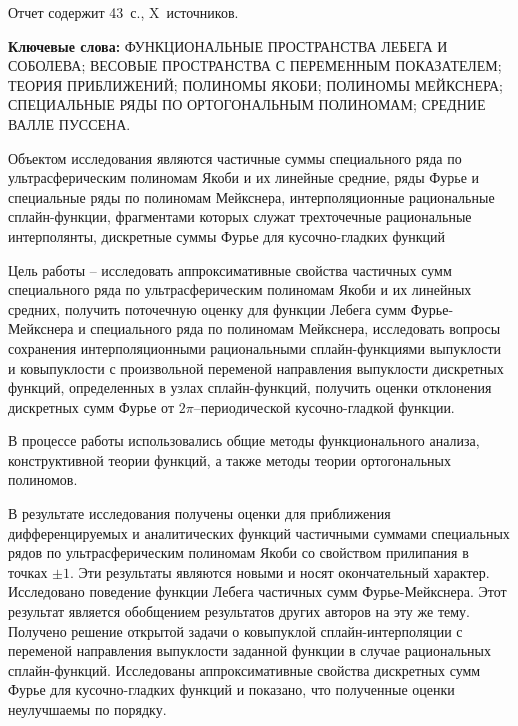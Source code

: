 \Referat %
Отчет содержит 43~с., X~источников.

\textbf{ Ключевые слова:}
ФУНКЦИОНАЛЬНЫЕ ПРОСТРАНСТВА ЛЕБЕГА И СОБОЛЕВА;
ВЕСОВЫЕ ПРОСТРАНСТВА С ПЕРЕМЕННЫМ ПОКАЗАТЕЛЕМ;
ТЕОРИЯ ПРИБЛИЖЕНИЙ;
ПОЛИНОМЫ ЯКОБИ;
ПОЛИНОМЫ МЕЙКСНЕРА;
СПЕЦИАЛЬНЫЕ РЯДЫ ПО ОРТОГОНАЛЬНЫМ ПОЛИНОМАМ;
СРЕДНИЕ ВАЛЛЕ ПУССЕНА.


Объектом исследования являются частичные суммы специального ряда по ультрасферическим полиномам Якоби и их линейные средние, ряды Фурье и специальные ряды по полиномам Мейкснера, интерполяционные рациональные сплайн-функции, фрагментами которых служат трехточечные  рациональные интерполянты, дискретные суммы Фурье для кусочно-гладких функций

Цель работы -- исследовать аппроксимативные свойства частичных сумм специального ряда по ультрасферическим полиномам Якоби и их линейных средних, получить поточечную оценку для функции Лебега сумм Фурье-Мейкснера и специального ряда по полиномам Мейкснера, исследовать вопросы сохранения интерполяционными рациональными
сплайн-функциями выпуклости и ковыпуклости с произвольной переменой направления выпуклости дискретных функций, определенных в узлах сплайн-функций, получить оценки отклонения дискретных сумм Фурье от $2\pi$--периодической кусочно-гладкой функции.

В процессе работы использовались общие методы функционального анализа, конструктивной теории функций, а также методы теории ортогональных полиномов.

В результате исследования получены оценки для приближения дифференцируемых и аналитических функций частичными суммами специальных рядов по ультрасферическим полиномам Якоби со свойством прилипания в точках $\pm1$. Эти результаты являются новыми и носят окончательный характер.
Исследовано поведение функции Лебега частичных сумм Фурье-Мейкснера. Этот результат является обобщением результатов других авторов на эту же тему.
Получено решение открытой задачи о ковыпуклой сплайн-интерполяции с переменой направления выпуклости заданной функции в случае рациональных сплайн-функций.
Исследованы аппроксимативные свойства дискретных сумм Фурье для кусочно-гладких функций и показано, что полученные оценки неулучшаемы по порядку.

